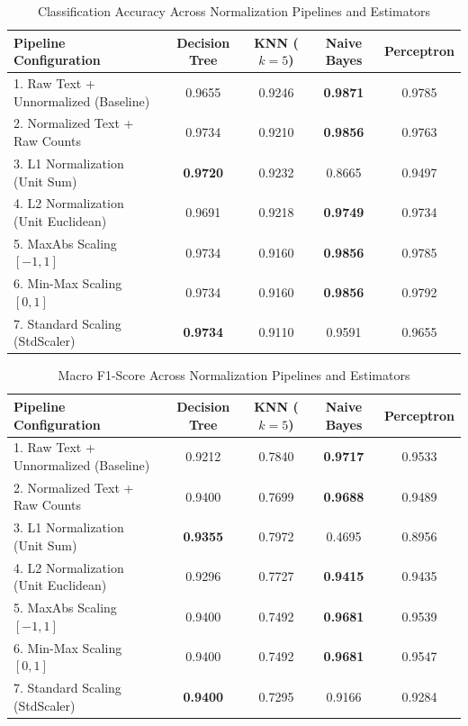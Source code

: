 \documentclass[12pt]{article}
\begin{document}
\begin{table}[H]
\centering
\small
\caption{Classification Accuracy Across Normalization Pipelines and Estimators}
\label{tab:accuracy_results}
\vspace{0.2cm}
\begin{tabular}{lcccc}
\toprule
\textbf{Pipeline Configuration} & \textbf{Decision Tree} & \textbf{KNN ($k=5$)} & \textbf{Naive Bayes} & \textbf{Perceptron} \\
\midrule
1. Raw Text + Unnormalized (Baseline) & 0.9655 & 0.9246 & \textbf{0.9871} & 0.9785 \\
2. Normalized Text + Raw Counts       & 0.9734 & 0.9210 & \textbf{0.9856} & 0.9763 \\
3. L1 Normalization (Unit Sum)        & \textbf{0.9720} & 0.9232 & 0.8665 & 0.9497 \\
4. L2 Normalization (Unit Euclidean)  & 0.9691 & 0.9218 & \textbf{0.9749} & 0.9734 \\
5. MaxAbs Scaling $[-1, 1]$           & 0.9734 & 0.9160 & \textbf{0.9856} & 0.9785 \\
6. Min-Max Scaling $[0, 1]$           & 0.9734 & 0.9160 & \textbf{0.9856} & 0.9792 \\
7. Standard Scaling (StdScaler)       & \textbf{0.9734} & 0.9110 & 0.9591 & 0.9655 \\
\bottomrule
\end{tabular}
\end{table}

\begin{table}[H]
\centering
\small
\caption{Macro F1-Score Across Normalization Pipelines and Estimators}
\label{tab:f1_results}
\vspace{0.2cm}
\begin{tabular}{lcccc}
\toprule
\textbf{Pipeline Configuration} & \textbf{Decision Tree} & \textbf{KNN ($k=5$)} & \textbf{Naive Bayes} & \textbf{Perceptron} \\
\midrule
1. Raw Text + Unnormalized (Baseline) & 0.9212 & 0.7840 & \textbf{0.9717} & 0.9533 \\
2. Normalized Text + Raw Counts       & 0.9400 & 0.7699 & \textbf{0.9688} & 0.9489 \\
3. L1 Normalization (Unit Sum)        & \textbf{0.9355} & 0.7972 & 0.4695 & 0.8956 \\
4. L2 Normalization (Unit Euclidean)  & 0.9296 & 0.7727 & \textbf{0.9415} & 0.9435 \\
5. MaxAbs Scaling $[-1, 1]$           & 0.9400 & 0.7492 & \textbf{0.9681} & 0.9539 \\
6. Min-Max Scaling $[0, 1]$           & 0.9400 & 0.7492 & \textbf{0.9681} & 0.9547 \\
7. Standard Scaling (StdScaler)       & \textbf{0.9400} & 0.7295 & 0.9166 & 0.9284 \\
\bottomrule
\end{tabular}
\end{table}
\end{document}
